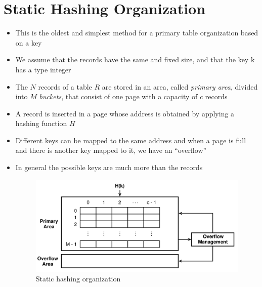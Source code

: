 \section{Static Hashing Organization}
\begin{itemize}
    \item This is the oldest and simplest method for a primary table organization based on a key
    \item We assume that the records have the same and fixed size, and that the key k has a type integer
    \item The \(N\) records of a table \(R\) are stored in an area, called \textit{primary area}, divided into \(M\) \textit{buckets}, that consist of one page with a capacity of \(c\) records
    \item A record is inserted in a page whose address is obtained by applying a hashing function \(H\)
    \item Different keys can be mapped to the same address and when a page is full and there is another key mapped to it, we have an “overflow” 
    \item In general the possible keys are much more than the records
    \begin{figure}[!h]
    \centering
    \includegraphics[width=0.7\linewidth]{images/DBMS_Internals/HashingOrganization/static_hashing.jpeg}
    \caption{Static hashing organization}
\end{figure}
\end{itemize}



